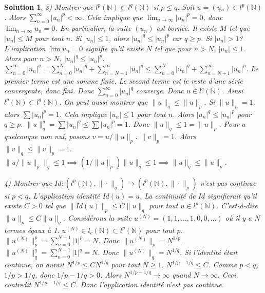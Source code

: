 \documentclass{article}
\newtheorem{solution}{Solution}
\begin{document}
\begin{solution}
3) Montrer que $l^p(\mathbb{N}) \subset l^q(\mathbb{N})$ si $p \le q$.
Soit $u = (u_n) \in l^p(\mathbb{N})$. Alors $\sum_{n=0}^\infty |u_n|^p < \infty$.
Cela implique que $\lim_{n \to \infty} |u_n|^p = 0$, donc $\lim_{n \to \infty} u_n = 0$.
En particulier, la suite $(u_n)$ est bornée. Il existe $M$ tel que $|u_n| \le M$ pour tout $n$.
Si $|u_n| \le 1$, alors $|u_n|^q \le |u_n|^p$ car $q \ge p$.
Si $|u_n| > 1$? L'implication $\lim u_n = 0$ signifie qu'il existe $N$ tel que pour $n > N$, $|u_n| \le 1$.
Alors pour $n > N$, $|u_n|^q \le |u_n|^p$.
$\sum_{n=0}^\infty |u_n|^q = \sum_{n=0}^N |u_n|^q + \sum_{n=N+1}^\infty |u_n|^q \le \sum_{n=0}^N |u_n|^q + \sum_{n=N+1}^\infty |u_n|^p$.
Le premier terme est une somme finie. Le second terme est le reste d'une série convergente, donc fini.
Donc $\sum_{n=0}^\infty |u_n|^q$ converge.
Donc $u \in l^q(\mathbb{N})$. Ainsi $l^p(\mathbb{N}) \subset l^q(\mathbb{N})$.
On peut aussi montrer que $\|u\|_q \le \|u\|_p$.
Si $\|u\|_p = 1$, alors $\sum |u_n|^p = 1$. Cela implique $|u_n| \le 1$ pour tout $n$.
Alors $|u_n|^q \le |u_n|^p$ pour $q \ge p$.
$\|u\|_q^q = \sum |u_n|^q \le \sum |u_n|^p = 1$. Donc $\|u\|_q \le 1 = \|u\|_p$.
Pour $u$ quelconque non nul, posons $v = u / \|u\|_p$. $\|v\|_p = 1$.
Alors $\|v\|_q \le \|v\|_p = 1$.
$\|u / \|u\|_p \|_q \le 1 \implies (1/\|u\|_p) \|u\|_q \le 1 \implies \|u\|_q \le \|u\|_p$.

4) Montrer que $Id: (l^p(\mathbb{N}), \| \cdot \|_q) \to (l^p(\mathbb{N}), \| \cdot \|_p)$ n'est pas continue si $p < q$.
L'application identité $Id(u) = u$.
La continuité de $Id$ signifierait qu'il existe $C > 0$ tel que $\|Id(u)\|_p \le C \|u\|_q$ pour tout $u \in l^p(\mathbb{N})$.
C'est-à-dire $\|u\|_p \le C \|u\|_q$.
Considérons la suite $u^{(N)} = (1, 1, \dots, 1, 0, 0, \dots)$ où il y a $N$ termes égaux à 1.
$u^{(N)} \in l_c(\mathbb{N}) \subset l^p(\mathbb{N})$ pour tout $p$.
$\|u^{(N)}\|_p^p = \sum_{n=0}^{N-1} |1|^p = N$. Donc $\|u^{(N)}\|_p = N^{1/p}$.
$\|u^{(N)}\|_q^q = \sum_{n=0}^{N-1} |1|^q = N$. Donc $\|u^{(N)}\|_q = N^{1/q}$.
Si l'identité était continue, on aurait $N^{1/p} \le C N^{1/q}$ pour tout $N \ge 1$.
$N^{1/p - 1/q} \le C$.
Comme $p < q$, $1/p > 1/q$, donc $1/p - 1/q > 0$.
Alors $N^{1/p - 1/q} \to \infty$ quand $N \to \infty$.
Ceci contredit $N^{1/p - 1/q} \le C$.
Donc l'application identité n'est pas continue.
\end{solution}
\end{document}

